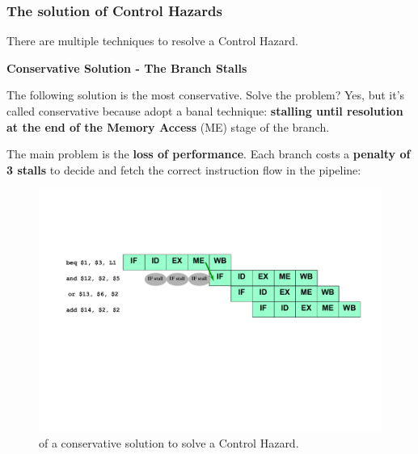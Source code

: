 \subsubsection{The solution of Control Hazards}

There are multiple techniques to resolve a Control Hazard.

\begin{flushleft}
    \textcolor{Green3}{\textbf{ Conservative Solution - The Branch Stalls}}
\end{flushleft}
The following solution is the most conservative. Solve the problem? Yes, but it's called conservative because adopt a banal technique: \textbf{stalling until resolution at the end of the Memory Access} (ME) stage of the branch.

\highspace
The main problem is the \textbf{loss of performance}. Each branch costs a \textbf{penalty of 3 stalls} to decide and fetch the correct instruction flow in the pipeline:
\begin{figure}[!htp]
    \centering
    \includegraphics[width=\textwidth]{img/conservative-solution-control-hazards.pdf}
    \caption{ of a conservative solution to solve a Control Hazard.}
\end{figure}

